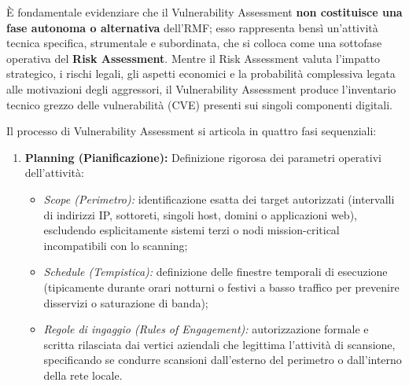 \documentclass[../../main.tex]{subfiles}
\begin{document}
È fondamentale evidenziare che il Vulnerability Assessment \textbf{non costituisce una fase autonoma o alternativa} dell'RMF; esso rappresenta bensì un'attività tecnica specifica, strumentale e subordinata, che si colloca come una sottofase operativa del \textbf{Risk Assessment}. Mentre il Risk Assessment valuta l'impatto strategico, i rischi legali, gli aspetti economici e la probabilità complessiva legata alle motivazioni degli aggressori, il Vulnerability Assessment produce l'inventario tecnico grezzo delle vulnerabilità (CVE) presenti sui singoli componenti digitali.

Il processo di Vulnerability Assessment si articola in quattro fasi sequenziali:

\begin{enumerate}
    \item \textbf{Planning (Pianificazione):} Definizione rigorosa dei parametri operativi dell'attività:
    \begin{itemize}
        \item \textit{Scope (Perimetro):} identificazione esatta dei target autorizzati (intervalli di indirizzi IP, sottoreti, singoli host, domini o applicazioni web), escludendo esplicitamente sistemi terzi o nodi mission-critical incompatibili con lo scanning;
        \item \textit{Schedule (Tempistica):} definizione delle finestre temporali di esecuzione (tipicamente durante orari notturni o festivi a basso traffico per prevenire disservizi o saturazione di banda);
        \item \textit{Regole di ingaggio (\textit{Rules of Engagement}):} autorizzazione formale e scritta rilasciata dai vertici aziendali che legittima l'attività di scansione, specificando se condurre scansioni dall'esterno del perimetro o dall'interno della rete locale.
    \end{itemize}
    

\end{enumerate}
\end{document}
